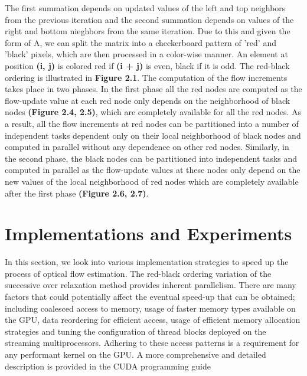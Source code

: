\documentclass[english]{article}
\begin{document}
	The first summation depends on updated values of the left and top neighbors from the previous iteration and the second summation depends on values of the right and bottom nieghbors from the same iteration. Due to this and given the form of A, we can split the matrix into a checkerboard pattern of 'red' and 'black' pixels, which are then processed in a color-wise manner. An element at position \textbf{(i, j)} is colored red if \textbf{(i + j)} is even, black if it is odd. The red-black ordering is illustrated in \textbf{Figure 2.1}. The computation of the flow increments takes place in two phases. In the first phase all the red nodes are computed as the flow-update value at each red node only depends on the neighborhood of black nodes \textbf{(Figure 2.4, 2.5)}, which are completely available for all the red nodes. As a result, all the flow increments at red nodes can be partitioned into a number of independent tasks dependent only on their local neighborhood of black nodes and computed in parallel without any dependence on other red nodes. Similarly, in the second phase, the black nodes can be partitioned into independent tasks and computed in parallel as the flow-update values at these nodes only depend on the new values of the local neighborhood of red nodes which are completely available after the first phase \textbf{(Figure 2.6, 2.7)}. %

	\section{Implementations and Experiments}
	In this section, we look into various implementation strategies to speed up the process of optical flow estimation. The red-black ordering variation of the successive over relaxation method provides inherent parallelism. There are many factors that could potentially affect the eventual speed-up that can be obtained; including coalesced access to memory, usage of faster memory types available on the GPU, data reordering for efficient access, usage of efficient memory allocation strategies and tuning the configuration of thread blocks deployed on the streaming multiprocessors. Adhering to these access patterns is a requirement for any performant kernel on the GPU. A more comprehensive and detailed description is provided in the CUDA programming guide \cite{11} 
\end{document}

